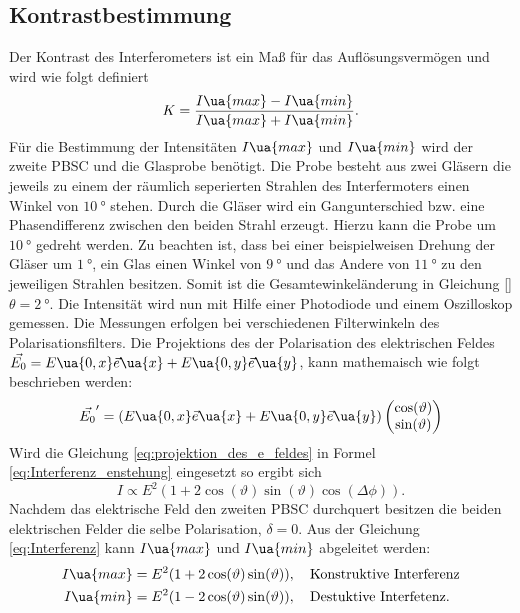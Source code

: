 \subsection{Kontrastbestimmung}\label{sec:Kontrastbestimmung}
Der Kontrast des Interferometers ist ein Maß für das Auflösungsvermögen und wird
wie folgt definiert
\begin{equation}
  \label{eq:kontrast}
  K = \frac{I\ua{max} - I\ua{min}}{I\ua{max}+I\ua{min}}.
\end{equation}
Für die Bestimmung der Intensitäten $I\ua{max}$ und $I\ua{min}$ wird der zweite
PBSC und die Glasprobe benötigt. Die Probe
besteht aus zwei Gläsern die jeweils zu einem der räumlich seperierten Strahlen
des Interfermoters einen Winkel von $\SI{10}{\degree}$ stehen. Durch die Gläser wird
ein Gangunterschied bzw. eine Phasendifferenz zwischen den beiden Strahl erzeugt.
Hierzu kann die Probe um $\SI{10}{\degree}$ gedreht werden. Zu beachten ist, dass
bei einer beispielweisen Drehung der Gläser um $\SI{1}{\degree}$, ein Glas
einen Winkel von $\SI{9}{\degree}$ und das Andere von $\SI{11}{\degree}$ zu den jeweiligen
Strahlen besitzen. Somit ist die Gesamtewinkeländerung in Gleichung \eqref{} $\theta = \SI{2}{\degree}$.
Die Intensität wird nun mit Hilfe einer Photodiode und einem Oszilloskop
gemessen. Die Messungen erfolgen bei verschiedenen Filterwinkeln des Polarisationsfilters.
Die Projektions des der Polarisation des elektrischen Feldes $\vec{E_0}=E\ua{0,x}\vec{e}\ua{x}
+E\ua{0,y}\vec{e}\ua{y}$, kann mathemaisch wie folgt beschrieben werden:
\begin{equation}
  \label{eq:projektion_des_e_feldes}
  \vec{E_0}'=\left(E\ua{0,x}\vec{e}\ua{x}+E\ua{0,y}\vec{e}\ua{y}\right) \begin{pmatrix} \cos(\vartheta) \\ \sin(\vartheta) \end{pmatrix}
\end{equation}
Wird die Gleichung \eqref{eq:projektion_des_e_feldes} in Formel \eqref{eq:Interferenz_enstehung}
eingesetzt so ergibt sich
\begin{equation}
  \label{eq:Interferenz}
  I\propto E^2(1+2\cos(\vartheta)\sin(\vartheta)\cos(\Delta\phi)).
\end{equation}
Nachdem das elektrische Feld den zweiten PBSC durchquert besitzen die beiden elektrischen Felder
die selbe Polarisation, $\delta = 0$. Aus der Gleichung \eqref{eq:Interferenz}
kann $I\ua{max}$ und $I\ua{min}$ abgeleitet werden:
\begin{align}
  \label{eq:I_max_und_I_min}
  \begin{aligned}
  I\ua{max} & = E^2(1+2\cos(\vartheta)\sin(\vartheta)), \quad \text{Konstruktive Interferenz} \\
  I\ua{min} & = E^2(1-2\cos(\vartheta)\sin(\vartheta)), \quad \text{Destuktive Interfetenz}.
\end{aligned}
\end{align}
